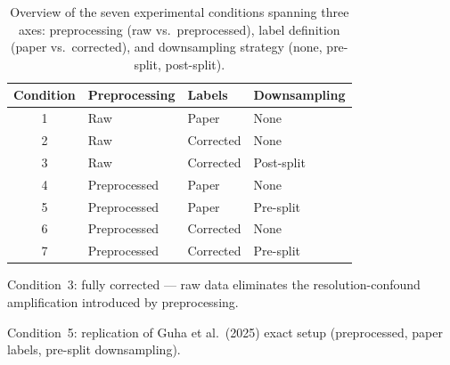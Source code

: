 

\begin{table}[htbp]
\centering
\caption{Overview of the seven experimental conditions spanning three axes:
         preprocessing (raw vs.\ preprocessed), label definition
         (paper vs.\ corrected), and downsampling strategy
         (none, pre-split, post-split).}
\label{tab:conditions}
\begin{threeparttable}
  \begin{tabular}{clll}
    \toprule
    \textbf{Condition} & \textbf{Preprocessing} & \textbf{Labels} & \textbf{Downsampling} \\
    \midrule
    1 & Raw          & Paper     & None       \\
    2 & Raw          & Corrected & None       \\
    \rowcolor{rowgreen}
    3 & Raw          & Corrected & Post-split \\
    4 & Preprocessed & Paper     & None       \\
    \rowcolor{roworange}
    5 & Preprocessed & Paper     & Pre-split  \\
    6 & Preprocessed & Corrected & None       \\
    7 & Preprocessed & Corrected & Pre-split  \\
    \bottomrule
  \end{tabular}
  \begin{tablenotes}
    \footnotesize
    \item[\textcolor{rowgreen!80!black}{$\blacksquare$}]
      Condition~3: fully corrected — raw data eliminates the
      resolution-confound amplification introduced by preprocessing.
    \item[\textcolor{roworange!80!black}{$\blacksquare$}]
      Condition~5: replication of Guha et al.\ (2025) exact setup
      (preprocessed, paper labels, pre-split downsampling).
  \end{tablenotes}
\end{threeparttable}
\end{table}
